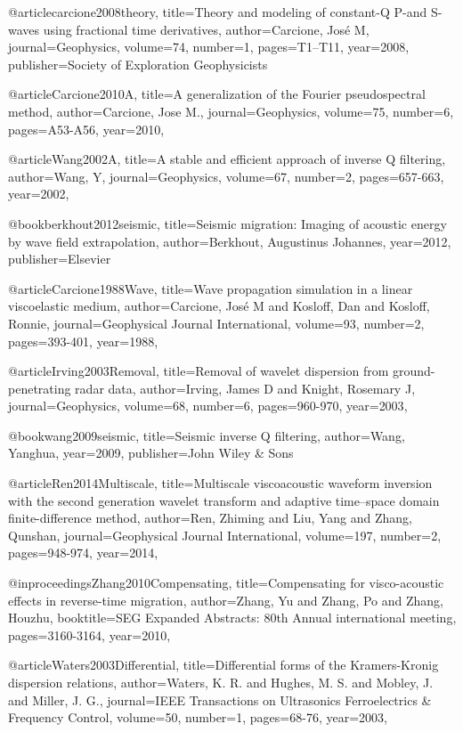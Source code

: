 {@article{carcione2008theory,
  title={Theory and modeling of constant-{Q} {P}-and {S}-waves using fractional time derivatives},
  author={Carcione, Jos{\'e} M},
  journal={Geophysics},
  volume={74},
  number={1},
  pages={T1--T11},
  year={2008},
  publisher={Society of Exploration Geophysicists}
}


@article{Carcione2010A,
  title={A generalization of the {F}ourier pseudospectral method},
  author={Carcione, Jose M.},
  journal={Geophysics},
  volume={75},
  number={6},
  pages={A53-A56},
  year={2010},
}

@article{Wang2002A,
  title={A stable and efficient approach of inverse {Q} filtering},
  author={Wang, Y},
  journal={Geophysics},
  volume={67},
  number={2},
  pages={657-663},
  year={2002},
}

@book{berkhout2012seismic,
  title={Seismic migration: Imaging of acoustic energy by wave field extrapolation},
  author={Berkhout, Augustinus Johannes},
  year={2012},
  publisher={Elsevier}
}

@article{Carcione1988Wave,
  title={Wave propagation simulation in a linear viscoelastic medium},
  author={Carcione, José M and Kosloff, Dan and Kosloff, Ronnie},
  journal={Geophysical Journal International},
  volume={93},
  number={2},
  pages={393-401},
  year={1988},
}

@article{Irving2003Removal,
  title={Removal of wavelet dispersion from ground-penetrating radar data},
  author={Irving, James D and Knight, Rosemary J},
  journal={Geophysics},
  volume={68},
  number={6},
  pages={960-970},
  year={2003},
}

@book{wang2009seismic,
  title={Seismic inverse {Q} filtering},
  author={Wang, Yanghua},
  year={2009},
  publisher={John Wiley \& Sons}
}

@article{Ren2014Multiscale,
  title={Multiscale viscoacoustic waveform inversion with the second generation wavelet transform and adaptive time–space domain finite-difference method},
  author={Ren, Zhiming and Liu, Yang and Zhang, Qunshan},
  journal={Geophysical Journal International},
  volume={197},
  number={2},
  pages={948-974},
  year={2014},
}

@inproceedings{Zhang2010Compensating,
  title={Compensating for visco-acoustic effects in reverse-time migration},
  author={Zhang, Yu and Zhang, Po and Zhang, Houzhu},
  booktitle={SEG Expanded Abstracts: 80th Annual international meeting},
  pages={3160-3164},
  year={2010},
}

@article{Waters2003Differential,
  title={Differential forms of the Kramers-Kronig dispersion relations},
  author={Waters, K. R. and Hughes, M. S. and Mobley, J. and Miller, J. G.},
  journal={IEEE Transactions on Ultrasonics Ferroelectrics \& Frequency Control},
  volume={50},
  number={1},
  pages={68-76},
  year={2003},
}

}
